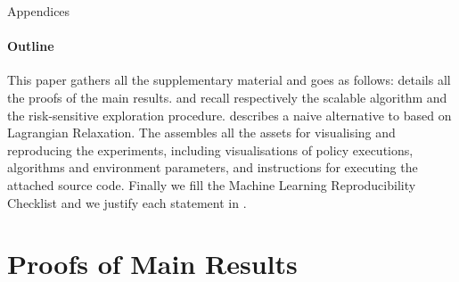 \begin{center}
\LARGE Appendices
\end{center}
\appendix

\paragraph{Outline}

This paper gathers all the supplementary material and goes as follows:  details all the proofs of the main results.  and  recall respectively the scalable \BFTQ algorithm and the risk-sensitive exploration procedure.  describes a naive alternative to \BFTQ based on Lagrangian Relaxation. The  assembles all the assets for visualising and reproducing the experiments, including visualisations of policy executions, algorithms and environment parameters, and instructions for executing the attached source code. Finally we fill the Machine Learning Reproducibility Checklist and we justify each statement in .





\section{Proofs of Main Results}
\label{sec:proofs}
\subsection{}

